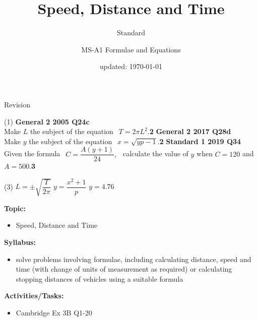 \documentclass[aspectratio=169,10pt]{beamer}
\title{Speed, Distance and Time}
\subtitle{Standard}
\author{MS-A1 Formulae and Equations}
\date{updated: \today
}
\begin{document}
\begin{frame}{Revision}
\begin{tasks}(1)
    \task \textbf{General 2 2005 Q24c}\\
    Make $L$ the subject of the equation $\ \ T=2\pi L^2$.\hfill\textbf{2}
    \task \textbf{General 2 2017 Q28d}\\
    Make $y$ the subject of the equation $\ \ x=\sqrt{yp-1}$.\hfill\textbf{2}
    \task \textbf{Standard 1 2019 Q34}\\
    Given the formula $\ \ C=\dfrac{A(y+1)}{24},\ \ $ calculate the value of $y$ when $C=120$ and $A=500$.\hfill\textbf{3}
\end{tasks}\vspace{7pt}\pause
  \begin{solution}[]
    \begin{tasks}(3)
    \task \pause$L=\pm\sqrt{\dfrac{T}{2\pi}}$
    \task \pause$y=\dfrac{x^2+1}{p}$
    \task \pause$y=4.76$
    \end{tasks}
    \end{solution}
\end{frame}

\frame{\titlepage}

\begin{frame}
  \begin{outcome}
    \textbf{Topic:}
    \begin{itemize}
      \item[] Speed, Distance and Time
    \end{itemize}

    \textbf{Syllabus:}
    \begin{itemize}
      \item solve problems involving formulae, including calculating distance, speed and time (with change of units of measurement as required) or calculating stopping distances of vehicles using a suitable formula
    \end{itemize}

    \textbf{Activities/Tasks:}
    \begin{itemize}
      \item Cambridge Ex 3B Q1-20
    \end{itemize}
  \end{outcome}
\end{frame}
\end{document}
